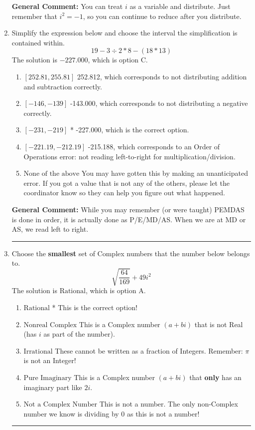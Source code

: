 \documentclass{extbook}[14pt]
\newcommand{\litem}[1]{\item #1

\rule{\textwidth}{0.4pt}}
\begin{document}
\begin{enumerate}
{\textbf{General Comment:} You can treat $i$ as a variable and distribute. Just remember that $i^2=-1$, so you can continue to reduce after you distribute.
}

\litem{
Simplify the expression below and choose the interval the simplification is contained within.
\[ 19 - 3 \div 2 * 8 - (18 * 13) \]
The solution is \( -227.000 \), which is option C.\begin{enumerate}[label=\Alph*.]
\item \( [252.81, 255.81] \)
 252.812, which corresponds to not distributing addition and subtraction correctly.
\item \( [-146, -139] \)
 -143.000, which corresponds to not distributing a negative correctly.
\item \( [-231, -219] \)
* -227.000, which is the correct option.
\item \( [-221.19, -212.19] \)
 -215.188, which corresponds to an Order of Operations error: not reading left-to-right for multiplication/division.
\item \( \text{None of the above} \)
 You may have gotten this by making an unanticipated error. If you got a value that is not any of the others, please let the coordinator know so they can help you figure out what happened.
\end{enumerate}

\textbf{General Comment:} While you may remember (or were taught) PEMDAS is done in order, it is actually done as P/E/MD/AS. When we are at MD or AS, we read left to right.
}
\litem{
Choose the \textbf{smallest} set of Complex numbers that the number below belongs to.
\[ \sqrt{\frac{64}{169}} + 49i^2 \]
The solution is \( \text{Rational} \), which is option A.\begin{enumerate}[label=\Alph*.]
\item \( \text{Rational} \)
* This is the correct option!
\item \( \text{Nonreal Complex} \)
This is a Complex number $(a+bi)$ that is not Real (has $i$ as part of the number).
\item \( \text{Irrational} \)
These cannot be written as a fraction of Integers. Remember: $\pi$ is not an Integer!
\item \( \text{Pure Imaginary} \)
This is a Complex number $(a+bi)$ that \textbf{only} has an imaginary part like $2i$.
\item \( \text{Not a Complex Number} \)
This is not a number. The only non-Complex number we know is dividing by 0 as this is not a number!
\end{enumerate}

}
\end{enumerate}
\end{document}
